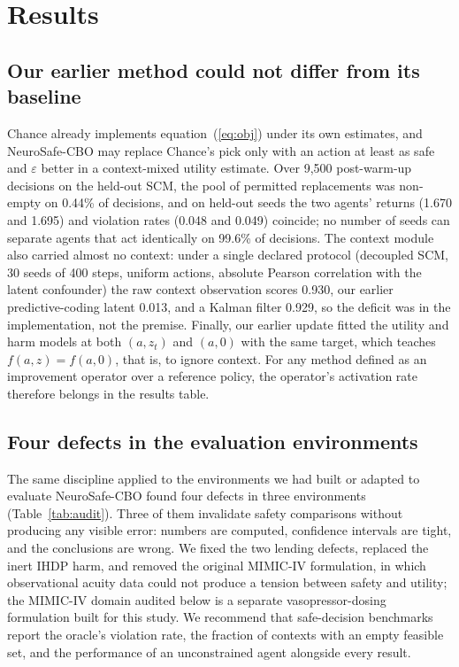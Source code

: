 \documentclass[10pt,a4paper]{article}
\begin{document}
\section*{Results}

\subsection*{Our earlier method could not differ from its baseline}
Chance already implements equation~(\ref{eq:obj}) under its own estimates, and NeuroSafe-CBO may
replace Chance's pick only with an action at least as safe and $\varepsilon$ better in a context-mixed
utility estimate. Over 9,500 post-warm-up decisions on the held-out SCM, the pool of permitted
replacements was non-empty on 0.44\% of decisions, and on held-out seeds the two agents' returns (1.670
and 1.695) and violation rates (0.048 and 0.049) coincide; no number of seeds can separate agents that
act identically on 99.6\% of decisions. The context module also carried almost no context: under a
single declared protocol (decoupled SCM, 30 seeds of 400 steps, uniform actions, absolute Pearson
correlation with the latent confounder) the raw context observation scores 0.930, our earlier predictive-coding latent 0.013, and a Kalman filter 0.929, so the deficit was in the implementation,
not the premise. Finally, our earlier update fitted the utility and harm models at both $(a,z_t)$
and $(a,0)$ with the same target, which teaches $f(a,z)=f(a,0)$, that is, to ignore context. For any
method defined as an improvement operator over a reference policy, the operator's activation rate
therefore belongs in the results table.

\subsection*{Four defects in the evaluation environments} The same discipline applied to the environments we had built or adapted to evaluate NeuroSafe-CBO found four defects in three environments (Table~\ref{tab:audit}).
Three of them invalidate safety comparisons without producing any visible error: numbers are computed,
confidence intervals are tight, and the conclusions are wrong. We fixed the two lending defects,
replaced the inert IHDP harm, and removed the original MIMIC-IV formulation, in which observational
acuity data could not produce a tension between safety and utility; the MIMIC-IV domain audited below
is a separate vasopressor-dosing formulation built for this study. We recommend that safe-decision
benchmarks report the oracle's violation rate, the fraction of contexts with an empty feasible set,
and the performance of an unconstrained agent alongside every result.
\end{document}
